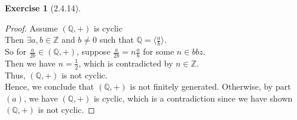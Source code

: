 \documentclass{amsart}
\newcommand{\bbz}{\mathbb{Z}}
\newcommand{\bbq}{\mathbb{Q}}
\theoremstyle{plain}
\theoremstyle{definition}
\newtheorem{exer}[lem]{Exercise}
\begin{document}
\begin{exer}[2.4.14]
\begin{enumerate}[(a)]
\begin{proof}
	Assume $(\bbq,+)$ is cyclic\\
	Then $\exists a,b \in \bbz$ and $b \neq 0$ such that $\bbq = \langle \frac{a}{b}\rangle$. \\
	So for $\frac{a}{2b} \in (\bbq,+)$, suppose $\frac{a}{2b} = n\frac{a}{b}$ for some $n \in bbz$.\\
	Then we have $n = \frac{1}{2}$, which is contradicted by $n\in \bbz$.\\
	Thus, $(\bbq,+)$ is not cyclic.\\
	Hence, we conclude that $(\bbq,+)$ is not finitely generated. Otherwise, by part $(a)$, we have $(\bbq,+)$ is cyclic, which is a contradiction since we have shown $(\bbq,+)$ is not cyclic.

	\end{proof}
\end{enumerate}
\end{exer}
\end{document}
